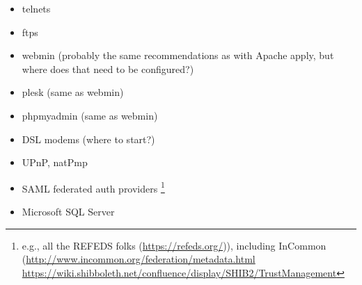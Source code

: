 \begin{multicols}{3}
\begin{itemize}
  \item telnets
  \item ftps
  \item webmin (probably the same recommendations as with Apache apply, but where does that need to be configured?)
  \item plesk (same as webmin)
  \item phpmyadmin (same as webmin)
  \item DSL modems (where to start?)
  \item UPnP, natPmp
  \item SAML federated auth providers \footnote{e.g., all the REFEDS folks (\url{https://refeds.org/})), including InCommon (\url{http://www.incommon.org/federation/metadata.html}
  \url{https://wiki.shibboleth.net/confluence/display/SHIB2/TrustManagement} }
  \item Microsoft SQL Server
\end{itemize}
\end{multicols}

